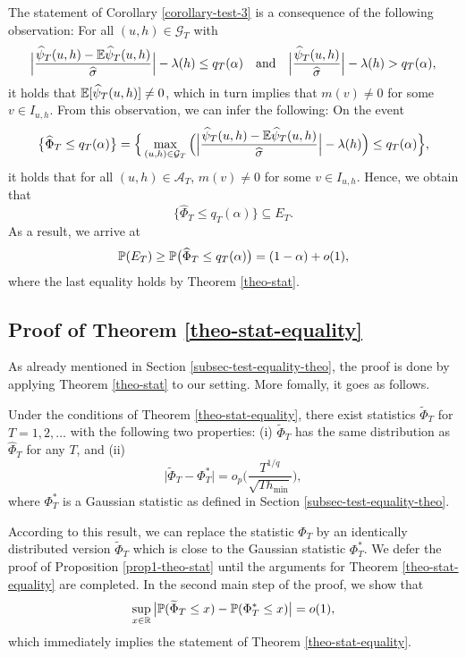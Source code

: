 \documentclass[a4paper,12pt]{article}
\numberwithin{equation}{section}
\begin{document}
 
The statement of Corollary \ref{corollary-test-3} is a consequence of the following observation: For all $(u,h) \in \mathcal{G}_T$ with 
\[ \Big|\frac{\widehat{\psi}_T(u,h) - \mathbb{E} \widehat{\psi}_T(u,h)}{\widehat{\sigma}}\Big| - \lambda(h) \le q_T(\alpha) \quad \text{and} \quad \Big|\frac{\widehat{\psi}_T(u,h)}{\widehat{\sigma}}\Big| - \lambda(h) > q_T(\alpha), \]
it holds that $\mathbb{E}[\widehat{\psi}_T(u,h)] \ne 0$, which in turn implies that $m(v) \ne 0$ for some $v \in I_{u,h}$. From this observation, we can infer the following: On the event 
\[ \big\{ \widehat{\Phi}_T \le q_T(\alpha) \big\} = \Big\{ \max_{(u,h) \in \mathcal{G}_T} \Big( \Big|\frac{\widehat{\psi}_T(u,h) - \mathbb{E} \widehat{\psi}_T(u,h)}{\widehat{\sigma}}\Big| - \lambda(h) \Big) \le q_T(\alpha) \Big\}, \]
it holds that for all $(u,h) \in \mathcal{A}_T$, 
$m(v) \ne 0$ for some $v \in I_{u,h}$. Hence, we obtain that 
\[ \big\{ \widehat{\Phi}_T \le q_T(\alpha) \big\} \subseteq E_T. \]
As a result, we arrive at  
\[ \mathbb{P}(E_T) \ge \mathbb{P} \big(  \widehat{\Phi}_T \le q_T(\alpha) \big) = (1-\alpha) + o(1), \]
where the last equality holds by Theorem \ref{theo-stat}.


 
\subsection*{Proof of Theorem \ref{theo-stat-equality}}


As already mentioned in Section \ref{subsec-test-equality-theo}, the proof is done by applying Theorem \ref{theo-stat} to our setting. More fomally, it goes as follows.


 
\begin{propA}\label{prop1-theo-stat-equality}
Under the conditions of Theorem \ref{theo-stat-equality}, there exist statistics $\widetilde{\Phi}_T$ for $T = 1,2,\ldots$ with the following two properties: (i) $\widetilde{\Phi}_T$ has the same distribution as $\widehat{\Phi}_T$ for any $T$, and (ii)
\[ \big| \widetilde{\Phi}_T - \Phi_T^* \big| = o_p \Big( \frac{T^{1/q}}{\sqrt{T h_{\min}}} \Big), \]
where $\Phi_T^*$ is a Gaussian statistic as defined in Section \ref{subsec-test-equality-theo}. 
\end{propA}
According to this result, we can replace the statistic $\widehat{\Phi}_T$ by an identically distributed version $\widetilde{\Phi}_T$ which is close to the Gaussian statistic $\Phi_T^*$. We defer the proof of Proposition \ref{prop1-theo-stat} until the arguments for Theorem \ref{theo-stat-equality} are completed. In the second main step of the proof, we show that 
\begin{equation}\label{eq-theo-stat-equality-step2}
\sup_{x \in \mathbb{R}} \big| \mathbb{P}(\widetilde{\Phi}_T \le x) - \mathbb{P}(\Phi_T^* \le x) \big| = o(1), 
\end{equation}
which immediately implies the statement of Theorem \ref{theo-stat-equality}.
\end{document}
